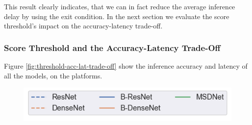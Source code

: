 This result clearly indicates, that we can in fact reduce the average inference delay by using the exit condition. In the next section we evaluate the score threshold's impact on the accuracy-latency trade-off.

\subsubsection{Score Threshold and the Accuracy-Latency Trade-Off}

Figure \ref{fig:threshold-acc-lat-trade-off} show the inference accuracy and latency of all the models, on the platforms. 

\begin{figure}
	\captionsetup[subfigure]{justification=centering,farskip=0pt,captionskip=0pt}
	\centering
	\includegraphics[width=.4\linewidth]{figures/threshold_plots/inference_legend}
	\hfill
	\hfill

\end{figure}
